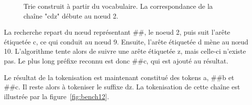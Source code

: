 \documentclass[12pt,a4paper]{report}
\begin{document}
\begin{figure}[H]
		\caption{Trie construit à partir du vocabulaire. La correspondance de la chaîne "cdz" débute au nœud 2.}
		\label{fig:bench11}
	\end{figure}
	
	La recherche repart du nœud représentant \#\#, le noeud 2, puis suit l'arête étiquetée c, ce qui conduit au nœud 9. Ensuite, l'arête étiquetée d mène au nœud 10. L'algorithme tente alors de suivre une arête étiquetée z, mais celle-ci n'existe pas. Le plus long préfixe reconnu est donc \#\#c, qui est ajouté au résultat.
	
	Le résultat de la tokenisation est maintenant constitué des tokens a, \#\#b et \#\#c. Il reste alors à tokeniser le suffixe dz. La tokenisation de cette chaîne est illustrée par la figure~\ref{fig:bench12}.
	
\end{document}
